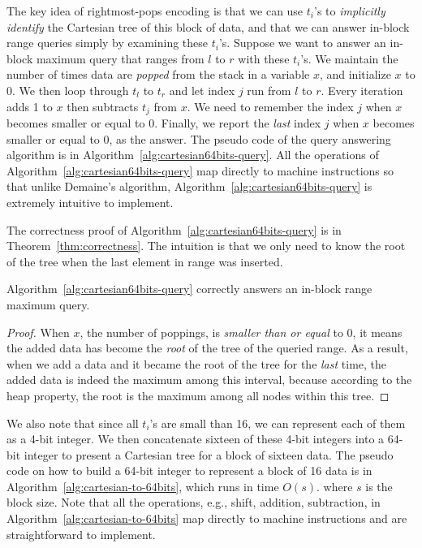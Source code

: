 The key idea of rightmost-pops encoding is that we can use $t_i$'s to
{\em implicitly identify} the Cartesian tree of this block of data, and
that we can answer in-block range queries simply by examining these
$t_i$'s.  Suppose we want to answer an in-block maximum query that
ranges from $l$ to $r$ with these $t_i$'s.  We maintain the number of
times data are {\em popped} from the stack in a variable $x$, and
initialize $x$ to 0.  We then loop through $t_l$ to $t_r$ and let index
$j$ run from $l$ to $r$.  Every iteration adds 1 to $x$ then subtracts
$t_j$ from $x$.  We need to remember the index $j$ when $x$ becomes
smaller or equal to 0.  Finally, we report the {\em last} index $j$ when
$x$ becomes smaller or equal to 0, as the answer.  The pseudo code of
the query answering algorithm is in
Algorithm~\ref{alg:cartesian64bits-query}.  All the operations of
Algorithm~\ref{alg:cartesian64bits-query} map directly to machine
instructions so that unlike Demaine's algorithm,
Algorithm~\ref{alg:cartesian64bits-query} is extremely intuitive to
implement.



The correctness proof of Algorithm~\ref{alg:cartesian64bits-query} is
in Theorem~\ref{thm:correctness}.  The intuition is that we only need
to know the root of the tree when the last element in range was
inserted.

\begin{theorem} \label{thm:correctness}
  Algorithm~\ref{alg:cartesian64bits-query} correctly answers an
  in-block range maximum query.
\end{theorem}
\begin{proof}
When $x$, the number of poppings, is {\em smaller than or equal} to 0,
it means the added data has become the {\em root} of the tree of the
queried range.  As a result, when we add a data and it became the root
of the tree for the {\em last} time, the added data is indeed the
maximum among this interval, because according to the heap property, the
root is the maximum among all nodes within this tree.
\end{proof}

We also note that since all $t_i$'s are small than 16, we can represent
each of them as a 4-bit integer.  We then concatenate sixteen of these
4-bit integers into a 64-bit integer to present a Cartesian tree for a
block of sixteen data.  The pseudo code on how to build a 64-bit integer
to represent a block of 16 data is in
Algorithm~\ref{alg:cartesian-to-64bits}, which runs in time $O(s)$.
where $s$ is the block size.  Note that all the operations, e.g., shift,
addition, subtraction, in Algorithm~\ref{alg:cartesian-to-64bits} map
directly to machine instructions and are straightforward to implement.

